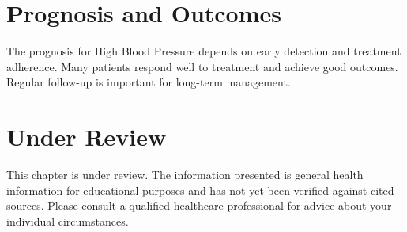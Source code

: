 \section*{Prognosis and Outcomes}
The prognosis for High Blood Pressure depends on early detection and treatment adherence. Many patients respond well to treatment and achieve good outcomes. Regular follow-up is important for long-term management.
\section*{Under Review}
This chapter is under review. The information presented is general health information for educational purposes and has not yet been verified against cited sources. Please consult a qualified healthcare professional for advice about your individual circumstances.


\clearpage
